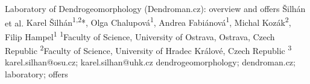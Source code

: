 {
}

\abstract
{Laboratory of Dendrogeomorphology (Dendroman.cz): overview and offers} 
{Šilhán et al.} 
{Karel Šilhán\textsuperscript{1,2}*, Olga Chalupová\textsuperscript{1}, Andrea Fabiánová\textsuperscript{1}, Michal Kozák\textsuperscript{2}, Filip Hampel\textsuperscript{1}} 
{\POtag} 
{
	\textsuperscript{1}Faculty of Science, University of Ostrava, Ostrava, Czech Republic
	\textsuperscript{2}Faculty of Science, University of Hradec Králové, Czech Republic
	\textsuperscript{3}
}
{karel.silhan@osu.cz; karel.silhan@uhk.cz}  %
{dendrogeomorphology; dendroman.cz; laboratory; offers}

